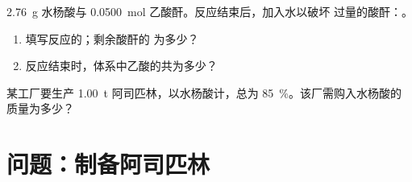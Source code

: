 \begin{exercise}[$\star\star\star$]\label{exo:g10:synthesis-yield:14}
\qty{2.76}{g} 水杨酸与 \qty{0.0500}{mol}
乙酸酐。反应结束后，加入水以破坏
过量的酸酐：。
\begin{enumerate}
  \item 填写反应的；剩余酸酐的
        为多少？
  \item 反应结束时，体系中乙酸的共为多少？
\end{enumerate}
\end{exercise}

\begin{exercise}[$\star\star\star$]\label{exo:g10:synthesis-yield:15}
某工厂要生产 \qty{1.00}{t} 阿司匹林，以水杨酸计，总为
\qty{85}{\percent}。该厂需购入水杨酸的
质量为多少？
\end{exercise}

\section{问题：制备阿司匹林}


